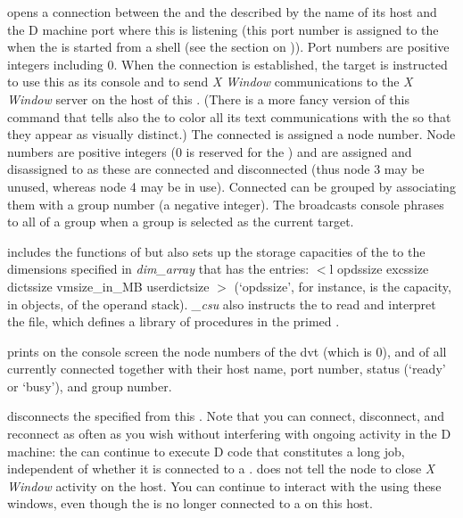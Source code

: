  opens a connection between the  and the
 described by the name of its host and the D machine port
where this  is listening (this port number is assigned to
the  when the  is started from a shell (see
the section on )). Port numbers are positive
integers including $0$. When the connection is established, the target
 is instructed to use this  as its console and
to send \emph{X Window} communications to the \emph{X Window} server
on the host of this . (There is a more fancy version of
this command that tells also the  to color all its text
communications with the  so that they appear as visually
distinct.) The connected  is assigned a node number. Node
numbers are positive integers ($0$ is reserved for the )
and are assigned and disassigned to  as these are
connected and disconnected (thus node 3 may be unused, whereas node 4
may be in use). Connected  can be grouped by
associating them with a group number (a negative integer). The
 broadcasts console phrases to all  of
a group when a group is selected as the current target.

 includes the functions of  but also sets up the
storage capacities of the  to the dimensions specified in
\emph{dim\_array} that has the entries: $<$l opdssize excssize
dictssize vmsize\_in\_MB userdictsize $>$ (`opdssize', for instance,
is the capacity, in objects, of the  operand
stack). \emph{\_csu} also instructs the  to read and
interpret the  file, which defines a library of
procedures in the primed .

 prints on the  console screen the node numbers of
the dvt (which is $0$), and of all currently connected
 together with their host name, port number,
status (`ready' or `busy'), and group number.

 disconnects the specified  from this
. Note that you can connect, disconnect, and reconnect
 as often as you wish without interfering with
ongoing activity in the  D machine: the
 can continue to execute D code that constitutes a long
job, independent of whether it is connected to a
.  does not tell the node to close \emph{X
  Window} activity on the  host. You can continue to
interact with the  using these windows, even though the
 is no longer connected to a  on this host.

